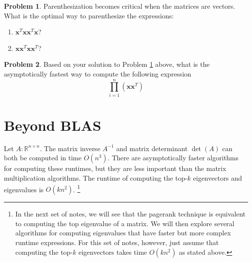 \documentclass[10pt]{article}
\theoremstyle{definition}
\newtheorem{problem}{Problem}
\newcommand{\R}{\mathbb R}
\DeclareMathOperator{\determinant}{det}
\newcommand{\trans}[1]{{#1}^{T}}
\newcommand{\x}{\mathbf x}
\begin{document}

\begin{problem}
    \label{prob:8}
    Parenthesization becomes critical when the matrices are vectors.
    What is the optimal way to parenthesize the expressions:
    \begin{enumerate}
        \item
            $\trans \x \x \trans \x \x$?
            \vspace{3in}
        \item
            $\x \trans \x \x \trans \x$?
            \vspace{3in}
    \end{enumerate}
\end{problem}

\begin{problem}
    Based on your solution to Problem \ref{prob:8} above,
    what is the asymptotically fastest way to compute the following expression
    \begin{equation}
        \prod_{i=1}^n (\x \trans \x)
    \end{equation}
    \vspace{2in}
\end{problem}


\newpage
\section{Beyond BLAS}

Let $A : \R^{n \times n}$.
The matrix inverse $A^{-1}$ and matrix determinant $\determinant(A)$ can both be computed in time $O(n^3)$.
There are asymptotically faster algorithms for computing these runtimes,
but they are less important than the matrix multiplication algorithms.
The runtime of computing the top-$k$ eigenvectors and eigenvalues is $O(kn^2)$.%
\footnote{
In the next set of notes, we will see that the pagerank technique is equivalent to computing the top eigenvalue of a matrix.
We will then explore several algorithms for computing eigenvalues that have faster but more complex runtime expressions.
For this set of notes, however, just assume that computing the top-$k$ eigenvectors takes time $O(kn^2)$ as stated above.
}
\end{document}
